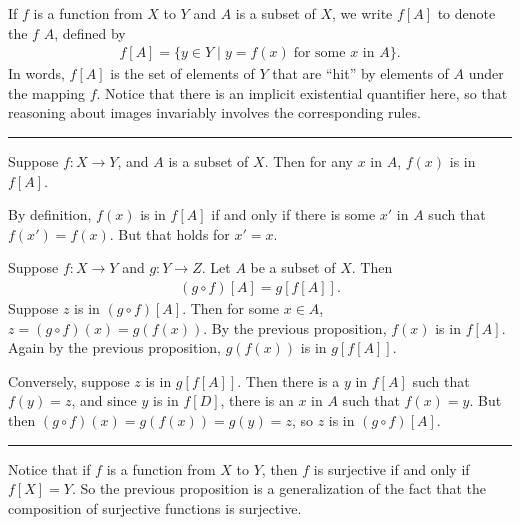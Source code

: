 \documentclass[letterpaper,10pt,english]{sphinxmanual}
\begin{document}
\sphinxAtStartPar
If \(f\) is a function from \(X\) to \(Y\) and \(A\) is a subset of \(X\), we write \(f[A]\) to denote the  \(f\)  \(A\), defined by
\begin{equation*}
\begin{split}f[A] = \{ y \in Y \mid y = f(x) \; \mbox{for some $x$ in $A$} \}.\end{split}
\end{equation*}
\sphinxAtStartPar
In words, \(f[A]\) is the set of elements of \(Y\) that are “hit” by elements of \(A\) under the mapping \(f\). Notice that there is an implicit existential quantifier here, so that reasoning about images invariably involves the corresponding rules.


\bigskip\hrule\bigskip


\sphinxAtStartPar
{} Suppose \(f : X \to Y\), and \(A\) is a subset of \(X\). Then for any \(x\) in \(A\), \(f(x)\) is in \(f[A]\).

\sphinxAtStartPar
{} By definition, \(f(x)\) is in \(f[A]\) if and only if there is some \(x'\) in \(A\) such that \(f(x') = f(x)\). But that holds for \(x' = x\).

\sphinxAtStartPar
{} Suppose \(f : X \to Y\) and \(g : Y \to Z\). Let \(A\) be a subset of \(X\). Then
\begin{equation*}
\begin{split}(g \circ f)[A] = g[f[A]].\end{split}
\end{equation*}
\sphinxAtStartPar
{} Suppose \(z\) is in \((g \circ f)[A]\). Then for some \(x \in A\), \(z = (g \circ f)(x) = g(f(x))\). By the previous proposition, \(f(x)\) is in \(f[A]\). Again by the previous proposition, \(g(f(x))\) is in \(g[f[A]]\).

\sphinxAtStartPar
Conversely, suppose \(z\) is in \(g[f[A]]\). Then there is a \(y\) in \(f[A]\) such that \(f(y) = z\), and since \(y\) is in \(f[D]\), there is an \(x\) in \(A\) such that \(f(x) = y\). But then \((g \circ f)(x) = g(f(x)) = g(y) = z\), so \(z\) is in \((g \circ f)[A]\).


\bigskip\hrule\bigskip


\sphinxAtStartPar
Notice that if \(f\) is a function from \(X\) to \(Y\), then \(f\) is surjective if and only if \(f[X] = Y\). So the previous proposition is a generalization of the fact that the composition of surjective functions is surjective.
\end{document}
